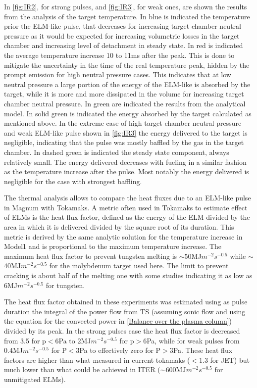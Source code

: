 In \autoref{fig:IR2}, for strong pulses, and \autoref{fig:IR3}, for weak ones, are shown the results from the analysis of the target temperature. In blue is indicated the temperature prior the ELM-like pulse, that decreases for increasing target chamber neutral pressure as it would be expected for increasing volumetric losses in the target chamber and increasing level of detachment in steady state. In red is indicated the average temperature increase 10 to 11ms after the peak. This is done to mitigate the uncertainty in the time of the real temperature peak, hidden by the prompt emission for high neutral pressure cases. This indicates that at low neutral pressure a large portion of the energy of the ELM-like is absorbed by the target, while it is more and more dissipated in the volume for increasing target chamber neutral pressure. In green are indicated the results from the analytical model. In solid green is indicated the energy absorbed by the target calculated as mentioned above. In the extreme case of high target chamber neutral pressure and weak ELM-like pulse shown in \autoref{fig:IR3} the energy delivered to the target is negligible, indicating that the pulse was mostly baffled by the gas in the target chamber. In dashed green is indicated the steady state component, always relatively small. The energy delivered decreases with fueling in a similar fashion as the temperature increase after the pulse. Most notably the energy delivered is negligible for the case with strongest baffling.

The thermal analysis allows to compare the heat fluxes due to an ELM-like pulse in Magnum with Tokamaks. A metric often used in Tokamaks to estimate effect of ELMs is the heat flux factor, defined as the energy of the ELM divided by the area in which it is delivered divided by the square root of its duration. This metric is derived by the same analytic solution for the temperature increase in Model1 and is proportional to the maximum temperature increase. The maximum heat flux factor to prevent tungsten melting is $\sim$50MJ$m^{-2} s^{-0.5}$ while $\sim$40MJ$m^{-2} s^{-0.5}$ for the molybdenum target used here. The limit to prevent cracking is about half of the melting one\cite{Pintsuk2007} with some studies indicating it as low as 6MJ$m^{-2} s^{-0.5}$ for tungsten.\cite{Linke2019}

The heat flux factor obtained in these experiments was estimated using as pulse duration the integral of the power flow from TS (assuming sonic flow and using the equation for the convected power in \autoref{Balance over the plasma column}) divided by its peak. In the strong pulses case the heat flux factor is decreased from 3.5 for p$<$6Pa to 2MJ$m^{-2} s^{-0.5}$ for p$>$6Pa, while for weak pulses from 0.4MJ$m^{-2} s^{-0.5}$ for P$<$3Pa to effectively zero for P$>$3Pa. These heat flux factors are higher than what measured in current tokamaks ($<$1.3 for JET) but much lower than what could be achieved in ITER ($\sim$600MJ$m^{-2} s^{-0.5}$ for unmitigated ELMs).\cite{Jachmich2011}

